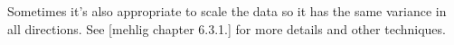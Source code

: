 Sometimes it's also appropriate to scale the data so it has the same variance in all directions. See [mehlig chapter 6.3.1.] for more details and other techniques.






